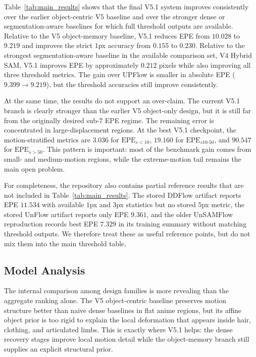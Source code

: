 Table~\ref{tab:main_results} shows that the final V5.1 system improves consistently over the earlier object-centric V5 baseline and over the stronger dense or segmentation-aware baselines for which full threshold outputs are available. Relative to the V5 object-memory baseline, V5.1 reduces EPE from $10.028$ to $9.219$ and improves the strict $1$px accuracy from $0.155$ to $0.230$. Relative to the strongest segmentation-aware baseline in the available comparison set, V4 Hybrid SAM, V5.1 improves EPE by approximately $0.212$ pixels while also improving all three threshold metrics. The gain over UPFlow is smaller in absolute EPE ($9.399 \rightarrow 9.219$), but the threshold accuracies still improve consistently.

At the same time, the results do not support an over-claim. The current V5.1 branch is clearly stronger than the earlier V5 object-only design, but it is still far from the originally desired sub-$7$ EPE regime. The remaining error is concentrated in large-displacement regions. At the best V5.1 checkpoint, the motion-stratified metrics are $3.036$ for $\mathrm{EPE}_{s<10}$, $19.160$ for $\mathrm{EPE}_{s10\text{-}50}$, and $90.547$ for $\mathrm{EPE}_{s>50}$. This pattern is important: most of the benchmark gain comes from small- and medium-motion regions, while the extreme-motion tail remains the main open problem.

For completeness, the repository also contains partial reference results that are not included in Table~\ref{tab:main_results}. The stored DDFlow artifact reports EPE $11.534$ with available $1$px and $3$px statistics but no stored $5$px metric, the stored UnFlow artifact reports only EPE $9.361$, and the older UnSAMFlow reproduction records best EPE $7.329$ in its training summary without matching threshold outputs. We therefore treat these as useful reference points, but do not mix them into the main threshold table.

\subsection{Model Analysis}

The internal comparison among design families is more revealing than the aggregate ranking alone. The V5 object-centric baseline preserves motion structure better than naive dense baselines in flat anime regions, but its affine object prior is too rigid to explain the local deformation that appears inside hair, clothing, and articulated limbs. This is exactly where V5.1 helps: the dense recovery stages improve local motion detail while the object-memory branch still supplies an explicit structural prior.

